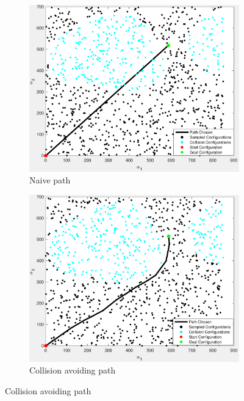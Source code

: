 \documentclass[letterpaper, 10 pt, conference]{ieeeconf}  %
\begin{document}
 \begin{figure}[thpb]
        \centering
        \begin{subfigure}[b]{1.4in} 
                \centering
                \includegraphics[width=\textwidth]{figures/path/path1.pdf}
                \caption{Naive path}
                \label{fig:path1}
        \end{subfigure}
        \begin{subfigure}[b]{1.4in}                            
                \centering
                \includegraphics[width=\textwidth]{figures/path/path2.pdf}
                \caption{Collision avoiding path}
                \label{fig:path2}
        \end{subfigure}
        

\end{figure}
\end{document}
